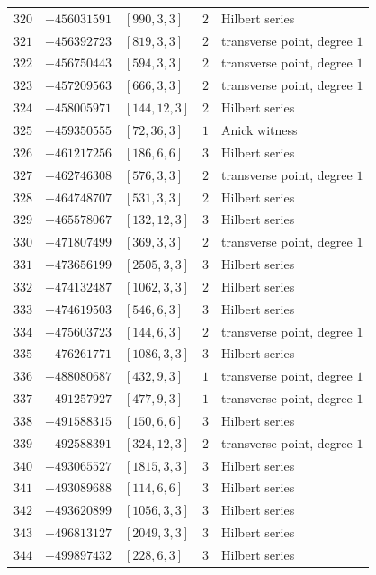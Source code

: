 \documentclass[11pt]{article}
\begin{document}
\begin{center}
\begin{longtable}{r r l c l}
$320$ & $-456031591$ & $[990,3,3]$ & $2$ & Hilbert series\\
$321$ & $-456392723$ & $[819,3,3]$ & $2$ & transverse point, degree $1$\\
$322$ & $-456750443$ & $[594,3,3]$ & $2$ & transverse point, degree $1$\\
$323$ & $-457209563$ & $[666,3,3]$ & $2$ & transverse point, degree $1$\\
$324$ & $-458005971$ & $[144,12,3]$ & $2$ & Hilbert series\\
$325$ & $-459350555$ & $[72,36,3]$ & $1$ & Anick witness\\
$326$ & $-461217256$ & $[186,6,6]$ & $3$ & Hilbert series\\
$327$ & $-462746308$ & $[576,3,3]$ & $2$ & transverse point, degree $1$\\
$328$ & $-464748707$ & $[531,3,3]$ & $2$ & Hilbert series\\
$329$ & $-465578067$ & $[132,12,3]$ & $3$ & Hilbert series\\
$330$ & $-471807499$ & $[369,3,3]$ & $2$ & transverse point, degree $1$\\
$331$ & $-473656199$ & $[2505,3,3]$ & $3$ & Hilbert series\\
$332$ & $-474132487$ & $[1062,3,3]$ & $2$ & Hilbert series\\
$333$ & $-474619503$ & $[546,6,3]$ & $3$ & Hilbert series\\
$334$ & $-475603723$ & $[144,6,3]$ & $2$ & transverse point, degree $1$\\
$335$ & $-476261771$ & $[1086,3,3]$ & $3$ & Hilbert series\\
$336$ & $-488080687$ & $[432,9,3]$ & $1$ & transverse point, degree $1$\\
$337$ & $-491257927$ & $[477,9,3]$ & $1$ & transverse point, degree $1$\\
$338$ & $-491588315$ & $[150,6,6]$ & $3$ & Hilbert series\\
$339$ & $-492588391$ & $[324,12,3]$ & $2$ & transverse point, degree $1$\\
$340$ & $-493065527$ & $[1815,3,3]$ & $3$ & Hilbert series\\
$341$ & $-493089688$ & $[114,6,6]$ & $3$ & Hilbert series\\
$342$ & $-493620899$ & $[1056,3,3]$ & $3$ & Hilbert series\\
$343$ & $-496813127$ & $[2049,3,3]$ & $3$ & Hilbert series\\
$344$ & $-499897432$ & $[228,6,3]$ & $3$ & Hilbert series\\

\end{longtable}
\end{center}
\end{document}
